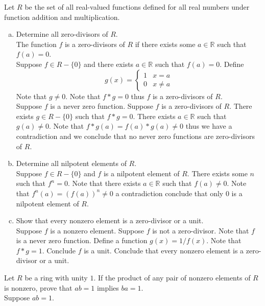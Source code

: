 \documentclass[12pt]{article}
\makeatletter
\theoremstyle{homework}
\newenvironment{exercise}[1]
{\def\@currentlabel{#1}\exercisecore}
{\endexercisecore}
\makeatother
\begin{document}
\begin{exercise}{13.28}
Let $R$ be the set of all real-valued functions defined for all real numbers under function addition and multiplication.
\begin{enumerate}[a)]
\item
Determine all zero-divisors of $R$.\\
The function $f$ is a zero-divisors of $R$ if there exists some $a\in \mathbb{R}$ such that $f(a)=0$.\\
Suppose $f\in R-\{0\}$ and there exists $a\in \mathbb{R}$ such that $f(a)=0$.  Define $$g(x)=\begin{cases} 1 & x=a\\ 0 & x\neq a \end{cases}$$  Note that $g\neq 0$.  Note that $f*g=0$ thus $f$ is a zero-divisors of $R$.\\
Suppose $f$ is a never zero function.  Suppose $f$ is a zero-divisors of $R$.  There exists $g\in R-\{0\}$ such that $f*g=0$.  There exists $a\in \mathbb{R}$ such that $g(a)\neq 0$.  Note that $f*g(a)=f(a)*g(a)\neq 0$ thus we have a contradiction and we conclude that no never zero functions are zero-divisors of $R$.
\item
Determine all nilpotent elements of $R$.\\
Suppose $f\in R-\{0\}$ and $f$ is a nilpotent element of $R$.  There exists some $n$ such that $f^n=0$.  Note that there exists $a\in\mathbb{R}$ such that $f(a)\neq 0$.  Note that $f^n(a)=(f(a))^n\neq 0$ a contradiction conclude that only $0$ is a nilpotent element of $R$.
\item
Show that every nonzero element is a zero-divisor or a unit.\\
Suppose $f$ is a nonzero element.  Suppose $f$ is not a zero-divisor.  Note that $f$ is a never zero function.  Define a function $g(x)=1/f(x)$.  Note that $f*g=1$.  Conclude $f$ is a unit.  Conclude that every nonzero element is a zero-divisor or a unit.
\end{enumerate}
\end{exercise}

\begin{exercise}{13.31}
Let $R$ be a ring with unity $1$. If the product of any pair of nonzero elements of $R$ is nonzero, prove that $ab = 1$ implies $ba = 1$.\\
Suppose $ab = 1$.
\end{exercise}

\begin{exercise}{13.35}

\end{exercise}

\begin{exercise}{13.51}

\end{exercise}
\end{document}
